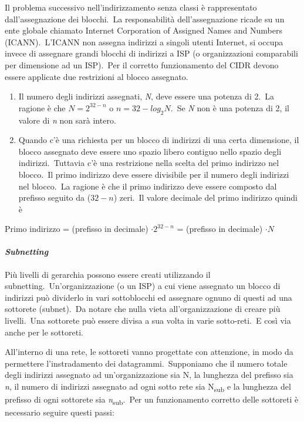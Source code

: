 Il problema successivo nell'indirizzamento senza classi è rappresentato dall'assegnazione dei blocchi.\
La responsabilità dell'assegnazione ricade su un ente globale chiamato Internet Corporation of Assigned Names and Numbers (ICANN).\
L'ICANN non assegna indirizzi a singoli utenti Internet, si occupa invece di assegnare grandi blocchi di indirizzi a ISP (o organizzazioni comparabili per dimensione ad un ISP).\
Per il corretto funzionamento del CIDR devono essere applicate due restrizioni al blocco assegnato.

\begin{enumerate}
    \item Il numero degli indirizzi assegnati, \emph{N}, deve essere una potenza di 2.\
          La ragione è che $N=2^{32-n}$ o $n=32-log_2N$.\
          Se \emph{N} non è una potenza di 2, il valore di \emph{n} non sarà intero.
    \item Quando c'è una richiesta per un blocco di indirizzi di una certa dimensione, il blocco assegnato deve essere uno spazio libero contiguo nello spazio degli indirizzi.\
          Tuttavia c'è una restrizione nella scelta del primo indirizzo nel blocco.\
          Il primo indirizzo deve essere divisibile per il numero degli indirizzi nel blocco.\
          La ragione è che il primo indirizzo deve essere composto dal prefisso seguito da ($32-n$) zeri.\
          Il valore decimale del primo indirizzo quindi è
\end{enumerate}

\begin{center}
    Primo indirizzo = (prefisso in decimale) $\cdot 2^{32-n}$ = (prefisso in decimale) $\cdot N$
\end{center}

\paragraph{\emph{Subnetting}}

Più livelli di gerarchia possono essere creati utilizzando il subnetting.\
Un'organizzazione (o un ISP) a cui viene assegnato un blocco di indirizzi può dividerlo in vari sottoblocchi ed assegnare ognuno di questi ad una sottorete (subnet).\
Da notare che nulla vieta all'organizzazione di creare più livelli.\
Una sottorete può essere divisa a sua volta in varie sotto-reti.\
E così via anche per le sottoreti.

All'interno di una rete, le sottoreti vanno progettate con attenzione, in modo da permettere l'instradamento dei datagrammi.\
Supponiamo che il numero totale degli indirizzi assegnato ad un'organizzazione sia N, la lunghezza del prefisso sia \emph{n}, il numero di indirizzi assegnato ad ogni sotto rete sia N\textsubscript{sub} e la lunghezza del prefisso di ogni sottorete sia \emph{n}\textsubscript{sub}.\
Per un funzionamento corretto delle sottoreti è necessario seguire questi passi:


